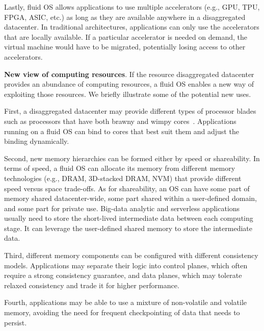 Lastly, fluid OS allows applications to use multiple
accelerators (e.g., GPU, TPU, FPGA, ASIC, etc.) as long as they are
available anywhere in a disaggregated datacenter.
In traditional architectures, applications can only use the
accelerators that are locally available.  If a particular accelerator
is needed on demand, the virtual machine would have to be migrated,
potentially losing access to other accelerators.

\noindent
\textbf{New view of computing resources}.
If the resource disaggregated datacenter provides an abundance of
computing resources, a fluid OS enables a new way
of exploiting those resources. We briefly illustrate some of the
potential new uses.

First, a disaggregated datacenter may provide different types of
processor blades such as processors that have both brawny and
wimpy cores~\cite{holzle2010brawny}. Applications running on a
fluid OS can bind to cores that best suit them and adjust
the binding dynamically.

Second, new memory hierarchies can be formed either by speed or
shareability. In terms of speed, a fluid OS can allocate
its memory from different memory technologies (e.g., DRAM, 3D-stacked
DRAM, NVM) that provide different speed versus space trade-offs. As for
shareability, an OS can have some part of memory shared
datacenter-wide, some part shared within a user-defined domain,
and some part for private use. Big-data analytic and serverless
applications usually need to store the short-lived intermediate
data between each computing stage. It can leverage the user-defined
shared memory to store the intermediate data.

Third, different memory components can be configured with different
consistency models. Applications may separate their logic into
control planes, which often require a strong consistency guarantee,
and data planes, which may tolerate relaxed consistency and trade
it for higher performance.

Fourth, applications may be able to use a mixture of non-volatile
and volatile memory, avoiding the need for frequent checkpointing
of data that needs to persist.

